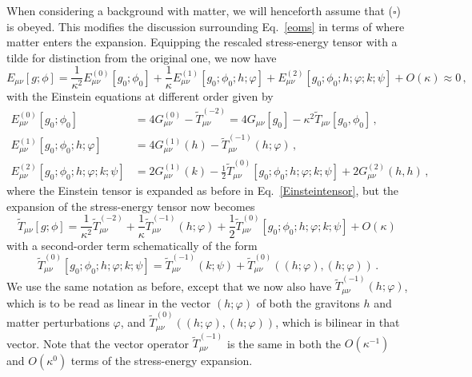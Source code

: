 \documentclass[]{jkpaper}
\theoremstyle{plain}
\theoremstyle{definition}
\begin{document}
When considering a background with matter, we will henceforth assume that ({\color{red}$\square$}) is obeyed. This modifies the discussion surrounding Eq.~\eqref{eoms} in terms of where matter enters the expansion.
Equipping the rescaled stress-energy tensor with a tilde for distinction from the original one, we now have
\begin{equation}
    E_{\mu \nu}[g;\phi]=\frac{1}{\kappa^2}E^{(0)}_{\mu \nu}[g_0;\phi_0]+\frac{1}{\kappa}E^{(1)}_{\mu \nu}[g_0;\phi_0;h;\varphi]+E_{\mu \nu}^{(2)}[g_0;\phi_0;h;\varphi;k;\psi]+O(\kappa)\approx 0\,,
\end{equation}
with the Einstein equations at different order given by
\begin{equation}\label{eoms2}
\begin{aligned}
    E_{\mu \nu}^{(0)}[g_0;\phi_0]&=4G_{\mu \nu}^{(0)}-\tilde{T}^{(-2)}_{\mu \nu}=4G_{\mu \nu}[g_0]-\kappa^2\tilde{T}_{\mu \nu}[g_0,\phi_0]\,,\\
    E_{\mu \nu}^{(1)}[g_0;\phi_0;h;\varphi]&=4G^{(1)}_{\mu \nu}(h)-\tilde{T}^{(-1)}_{\mu \nu}(h;\varphi)\,,\\
    E_{\mu \nu}^{(2)}[g_0;\phi_0;h;\varphi;k;\psi]&=2G^{(1)}_{\mu \nu}(k)-\frac{1}{2}\tilde{T}^{(0)}_{\mu \nu}[g_0;\phi_0;h;\varphi;k;\psi]+2G_{\mu \nu}^{(2)}(h,h)\,,
\end{aligned}
\end{equation}
where the Einstein tensor is expanded as before in Eq.~\eqref{Einsteintensor}, but the expansion of the stress-energy tensor now becomes
\begin{equation}
    \tilde{T}_{\mu \nu}[g;\phi]=\frac{1}{\kappa^2}\tilde{T}^{(-2)}_{\mu \nu}+\frac{1}{\kappa} \tilde{T}^{(-1)}_{\mu \nu}(h;\varphi)+\frac{1}{2}\tilde{T}^{(0)}_{\mu \nu}[g_0;\phi_0;h;\varphi;k;\psi]+O(\kappa)\,
\end{equation}
with a second-order term schematically of the form
\begin{equation}
    \tilde{T}^{(0)}_{\mu \nu}[g_0;\phi_0;h;\varphi;k;\psi]= \tilde{T}^{(-1)}_{\mu \nu}(k;\psi) +\tilde{T}^{(0)}_{\mu \nu}\left((h;\varphi),(h;\varphi)\right) \,.
\end{equation}
We use the same notation as before, except that we now also have $\tilde{T}^{(-1)}_{\mu \nu}(h;\varphi)$, which is to be read as linear in the vector $(h;\varphi)$ of both the gravitons $h$ and matter perturbations $\varphi$, and $\tilde{T}^{(0)}_{\mu \nu}((h;\varphi),(h;\varphi))$, which is bilinear in that vector. Note that the vector operator $\tilde{T}^{(-1)}_{\mu \nu}$ is the same in both the $O(\kappa^{-1})$ and $O(\kappa^0)$ terms of the stress-energy expansion.
\end{document}
